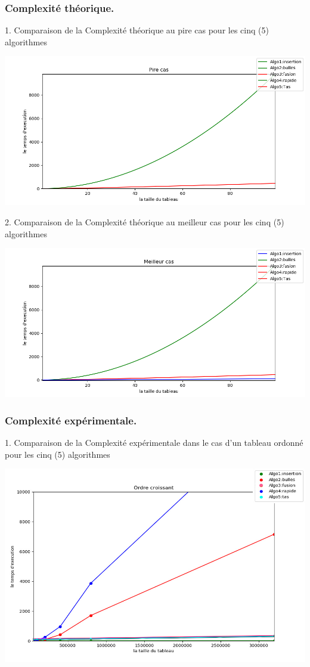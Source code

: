 \documentclass[12pt]{article}
\begin{document}
\subsubsection{Complexité théorique.}

1. Comparaison de la Complexité théorique au pire cas pour les cinq (5) algorithmes
	
		\includegraphics[width=1\textwidth]{graph/All_pire.png}
	
	
2. Comparaison de la Complexité théorique au meilleur cas pour les cinq (5) algorithmes
		
			\includegraphics[width=1\textwidth]{graph/All_meilleur.png}
	

\subsubsection{Complexité expérimentale.}
1. Comparaison de la Complexité expérimentale dans le cas d'un tableau ordonné pour les cinq (5) algorithmes
	
		\includegraphics[width=1\textwidth]{graph/ordre_croissant.png}
	
\end{document}
